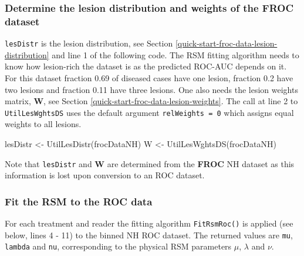 \documentclass[
]{book}
\newenvironment{Shaded}{\begin{snugshade}}{\end{snugshade}}
\newcommand{\FunctionTok}[1]{\textcolor[rgb]{0.00,0.00,0.00}{#1}}
\newcommand{\NormalTok}[1]{#1}
\newcommand{\OtherTok}[1]{\textcolor[rgb]{0.56,0.35,0.01}{#1}}
\begin{document}
\hypertarget{determine-the-lesion-distribution-and-weights-of-the-froc-dataset}{%
\subsubsection{Determine the lesion distribution and weights of the FROC dataset}\label{determine-the-lesion-distribution-and-weights-of-the-froc-dataset}}

\texttt{lesDistr} is the lesion distribution, see Section \ref{quick-start-froc-data-lesion-distribution} and line 1 of the following code. The RSM fitting algorithm needs to know how lesion-rich the dataset is as the predicted ROC-AUC depends on it. For this dataset fraction 0.69 of diseased cases have one lesion, fraction 0.2 have two lesions and fraction 0.11 have three lesions. One also needs the lesion weights matrix, \(\textbf{W}\), see Section \ref{quick-start-froc-data-lesion-weights}. The call at line 2 to \texttt{UtilLesWghtsDS} uses the default argument \texttt{relWeights\ =\ 0} which assigns equal weights to all lesions.

\begin{Shaded}
\begin{Highlighting}[numbers=left,,]
\NormalTok{lesDistr }\OtherTok{\textless{}{-}} \FunctionTok{UtilLesDistr}\NormalTok{(frocDataNH)}
\NormalTok{W }\OtherTok{\textless{}{-}} \FunctionTok{UtilLesWghtsDS}\NormalTok{(frocDataNH)}
\end{Highlighting}
\end{Shaded}

Note that \texttt{lesDistr} and \(\textbf{W}\) are determined from the \textbf{FROC} NH dataset as this information is lost upon conversion to an ROC dataset.

\hypertarget{fit-the-rsm-to-the-roc-data}{%
\subsubsection{Fit the RSM to the ROC data}\label{fit-the-rsm-to-the-roc-data}}

For each treatment and reader the fitting algorithm \texttt{FitRsmRoc()} is applied (see below, lines 4 - 11) to the binned NH ROC dataset. The returned values are \texttt{mu}, \texttt{lambda} and \texttt{nu}, corresponding to the physical RSM parameters \(\mu\), \(\lambda\) and \(\nu\).
\end{document}
